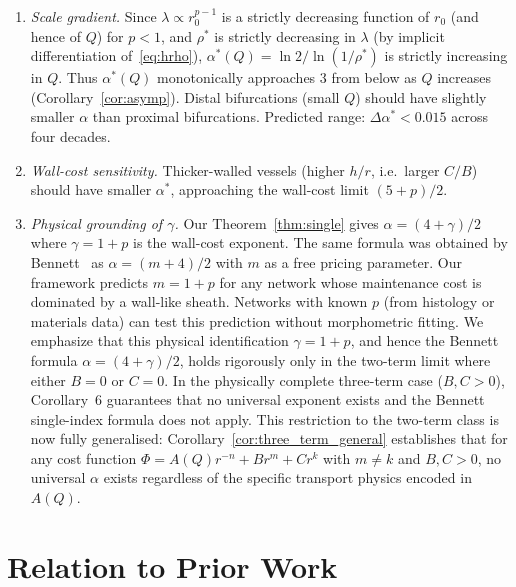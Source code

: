 \documentclass[11pt,a4paper]{article}
\theoremstyle{remark}
\begin{document}
\begin{enumerate}
\item \emph{Scale gradient.}
Since $\lambda\propto r_0^{p-1}$ is a strictly decreasing function of $r_0$ (and
hence of $Q$) for $p<1$,
and $\rho^*$ is strictly decreasing in $\lambda$ (by implicit differentiation
of~\eqref{eq:hrho}),
$\alpha^*(Q)=\ln 2/\ln(1/\rho^*)$ is strictly increasing in $Q$.
Thus $\alpha^*(Q)$ monotonically approaches 3 from below as $Q$ increases
(Corollary~\ref{cor:asymp}).
Distal bifurcations (small $Q$) should have slightly smaller $\alpha$ than
proximal bifurcations.
Predicted range: $\Delta\alpha^*<0.015$ across four decades.

\item \emph{Wall-cost sensitivity.}
Thicker-walled vessels (higher $h/r$, i.e.\ larger $C/B$) should have
smaller $\alpha^*$, approaching the wall-cost limit $(5+p)/2$.

\item \emph{Physical grounding of $\gamma$.}
Our Theorem~\ref{thm:single} gives $\alpha=(4+\gamma)/2$ where $\gamma=1+p$ is
the wall-cost exponent.
The same formula was obtained by Bennett~\cite{bennett2025} as $\alpha=(m+4)/2$
with $m$ as a free pricing parameter.
Our framework predicts $m=1+p$ for any network whose maintenance cost is
dominated by a wall-like sheath.
Networks with known $p$ (from histology or materials data) can test this
prediction without morphometric fitting. We emphasize that this physical
identification $\gamma = 1+p$, and hence the Bennett formula $\alpha =
(4+\gamma)/2$, holds rigorously only in the two-term limit where either $B = 0$
or $C = 0$. In the physically complete three-term case ($B, C > 0$), Corollary~6
guarantees that no universal exponent exists and the Bennett single-index
formula does not apply. This restriction to the two-term class is now fully generalised:
Corollary~\ref{cor:three_term_general} establishes that for any cost
function $\Phi = A(Q)r^{-n} + Br^m + Cr^k$ with $m \neq k$ and
$B,C>0$, no universal $\alpha$ exists regardless of the specific
transport physics encoded in $A(Q)$.
\end{enumerate}

\section{Relation to Prior Work}
\label{sec:discussion}
\end{document}
